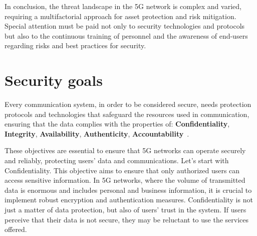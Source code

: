 \documentclass[english]{article}
\begin{document}
In conclusion, the threat landscape in the 5G network is complex and varied,
requiring a multifactorial approach for asset protection and risk mitigation.
Special attention must be paid not only to security technologies and protocols
but also to the continuous training of personnel and the awareness of end-users
regarding risks and best practices for security.

\section{Security goals}\label{sec:SecurityGoal}
Every communication system, in order to be considered secure, needs protection
protocols and technologies that safeguard the resources used in communication,
ensuring that the data complies with the properties of:
\textbf{Confidentiality}, \textbf{Integrity}, \textbf{Availability},
\textbf{Authenticity}, \textbf{Accountability}~\cite{mohan2022cyber}.

These objectives are essential to ensure that 5G networks can operate securely
and reliably, protecting users' data and communications. Let’s start with
Confidentiality. This objective aims to ensure that only authorized users can
access sensitive information. In 5G networks, where the volume of transmitted
data is enormous and includes personal and business information, it is crucial
to implement robust encryption and authentication measures. Confidentiality is
not just a matter of data protection, but also of users' trust in the system.
If users perceive that their data is not secure, they may be reluctant to use
the services offered.
\end{document}

